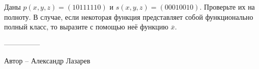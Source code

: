 \question
Даны $p(x, y, z) = (10111110)$ и $s(x, y, z) = (00010010)$. Проверьте их на полноту. В случае, если некоторая функция представляет собой функционально полный класс, то выразите с помощью неё функцию  $\overline{x}$.

---------------

Автор -- Александр Лазарев